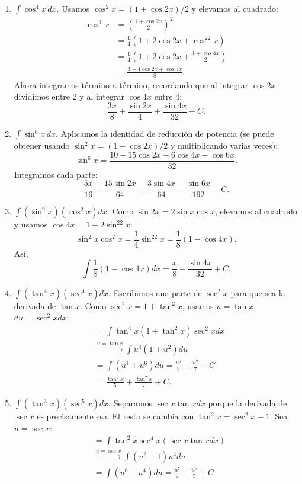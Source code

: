 \documentclass[12pt, letterpaper]{article}
\makeatletter
\renewcommand{\alph}[1]{\expandafter\@alphlatin\csname c@#1\endcsname}
\newcommand{\@alphlatin}[1]{\ifcase#1\or a\or b\or c\or d\or e\or f\or g\or h\or i\or j\or k\or l\or m\or n\or o\or p\or q\or r\or s\or t\or u\or v\or w\or x\or y\or z\else\@ctrerr\fi}
\makeatother
\begin{document}
\begin{enumerate}[label=\alph*)]
\[  \]
  \item $\displaystyle\int\cos^4x\,dx$. Usamos $\cos^2x=(1+\cos2x)/2$ y elevamos al cuadrado:
  \[
  \begin{aligned}
  \cos^4x&=\left(\frac{1+\cos2x}{2}\right)^2\\
  &=\frac14(1+2\cos2x+\cos^22x)\\
  &=\frac14\left(1+2\cos2x+\frac{1+\cos4x}{2}\right)\\
  &=\frac{3+4\cos2x+\cos4x}{8}.
  \end{aligned}
  \]
  Ahora integramos término a término, recordando que al integrar $\cos2x$ dividimos entre 2 y al integrar $\cos4x$ entre 4:
  \[
  \boxed{\frac{3x}{8}+\frac{\sin2x}{4}+\frac{\sin4x}{32}+C}.
  \]
  \item $\displaystyle\int\sin^6x\,dx$. Aplicamos la identidad de reducción de potencia (se puede obtener usando $\sin^2x=(1-\cos2x)/2$ y multiplicando varias veces):
  \[
  \sin^6x=\frac{10-15\cos2x+6\cos4x-\cos6x}{32}.
  \]
  Integramos cada parte:
  \[
  \boxed{\frac{5x}{16}-\frac{15\sin2x}{64}+\frac{3\sin4x}{64}-\frac{\sin6x}{192}+C}.
  \]
  \item $\displaystyle\int(\sin^2x)(\cos^2x)dx$. Como $\sin2x=2\sin x\cos x$, elevamos al cuadrado y usamos $\cos4x=1-2\sin^22x$:
  \[
  \sin^2x\cos^2x=\frac14\sin^22x=\frac18(1-\cos4x).
  \]
  Así,
  \[
  \int\frac18(1-\cos4x)dx=\boxed{\frac{x}{8}-\frac{\sin4x}{32}+C}.
  \]
  \item $\displaystyle\int(\tan^4x)(\sec^4x)dx$. Escribimos una parte de $\sec^2x$ para que sea la derivada de $\tan x$. Como $\sec^2x=1+\tan^2x$, usamos $u=\tan x$, $du=\sec^2x dx$:
  \[
  \begin{aligned}
  &=\int\tan^4x(1+\tan^2x)\sec^2x dx\\
  &\xrightarrow{u=\tan x}\int u^4(1+u^2)du\\
  &=\int(u^4+u^6)du=\frac{u^5}{5}+\frac{u^7}{7}+C\\
  &=\boxed{\frac{\tan^5x}{5}+\frac{\tan^7x}{7}+C}.
  \end{aligned}
  \]
  \item $\displaystyle\int(\tan^3x)(\sec^5x)dx$. Separamos $\sec x\tan xdx$ porque la derivada de $\sec x$ es precisamente esa. El resto se cambia con $\tan^2x=\sec^2x-1$. Sea $u=\sec x$:
  \[
  \begin{aligned}
  &=\int\tan^2x\sec^4x(\sec x\tan xdx)\\
  &\xrightarrow{u=\sec x}\int(u^2-1)u^4du\\
  &=\int(u^6-u^4)du=\frac{u^7}{7}-\frac{u^5}{5}+C\\

\end{aligned}\]
\end{enumerate}
\end{document}
